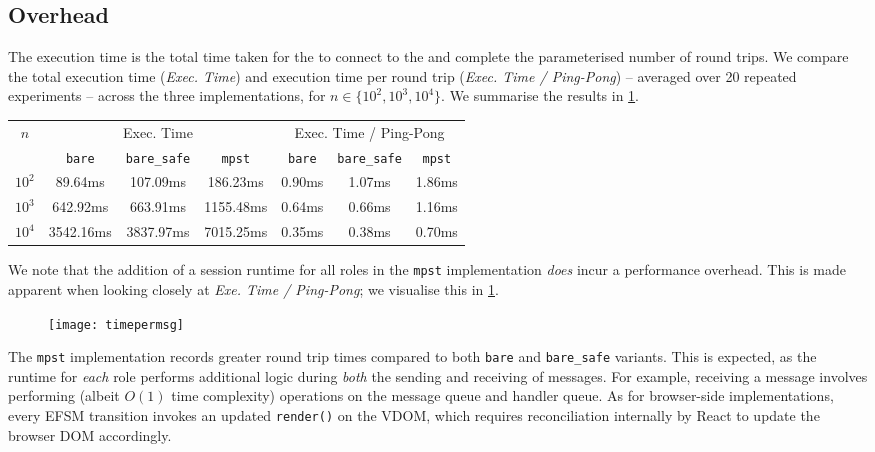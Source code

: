 \subsection{Overhead}
The execution time is the total time taken
for the  to connect to the 
and complete the parameterised number of round trips.
We compare the total execution time (\textit{Exec. Time}) 
and execution time per round trip (\textit{Exec. Time / Ping-Pong}) -- 
averaged over 20 repeated experiments -- across the three implementations,
for $n \in \{10^2, 10^3, 10^4\}$.
We summarise the results in \cref{table:overhead}.

\renewcommand{\arraystretch}{1.5}
\begin{table}[!ht]
\centering
\begin{tabular}{||c||c|c|c||c|c|c||}
\hline
\multirow{2}{*}{$n$} & 
\multicolumn{3}{c||}{Exec. Time} & 
\multicolumn{3}{c||}{Exec. Time / Ping-Pong} \\
\cline{2-7}
 & \texttt{bare} & \texttt{bare_safe} & \texttt{mpst} 
 & \texttt{bare} & \texttt{bare_safe} & \texttt{mpst} \\
\hline\hline
$10^2$ & 89.64ms & 107.09ms & 186.23ms & 0.90ms & 1.07ms & 1.86ms \\
$10^3$ & 642.92ms & 663.91ms & 1155.48ms & 0.64ms & 0.66ms & 1.16ms \\
$10^4$ & 3542.16ms & 3837.97ms & 7015.25ms & 0.35ms & 0.38ms & 0.70ms \\
\hline
\end{tabular}
\label{table:overhead}
\end{table}
\renewcommand{\arraystretch}{1}

We note that the addition of a session runtime for all roles in the 
\texttt{mpst} implementation \textit{does} incur a performance overhead. 
This is made apparent when looking closely at 
\textit{Exe. Time / Ping-Pong};
we visualise this in \cref{fig:timepermsg}.

\begin{figure}[!ht]
\centering
\texttt{[image: timepermsg]}
\label{fig:timepermsg}
\end{figure}

The \texttt{mpst} implementation records greater round trip times compared
to both \texttt{bare} and \texttt{bare_safe} variants. This is expected,
as the runtime for \textit{each} role performs additional logic during
\textit{both} the sending and receiving of messages. 
For example, receiving a message involves performing
(albeit $O(1)$ time complexity) operations on the message queue and
handler queue. As for browser-side implementations, every EFSM transition
invokes an updated \texttt{render()} on the VDOM, which requires
reconciliation internally by React to update the browser DOM accordingly.

